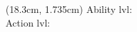 \begin{textblock*}{6cm}(18.3cm, 1.735cm)
    \scriptsize{
        Ability lvl: \AbilityLevel
        \\
        Action lvl: \ActionLevel
    }
\end{textblock*}